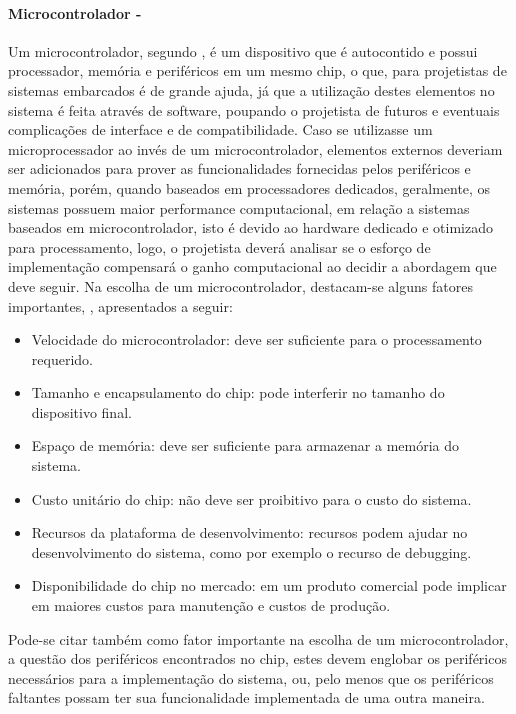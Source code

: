 \paragraph{\textbf{Microcontrolador -}}
Um microcontrolador, segundo , é um dispositivo que é autocontido e possui processador, memória e periféricos em um mesmo chip, o que, para projetistas de sistemas embarcados é de grande ajuda, já que a utilização destes elementos no sistema é feita através de software, poupando o projetista de futuros e eventuais complicações de interface e de compatibilidade. Caso se utilizasse um microprocessador ao invés de um microcontrolador, elementos externos deveriam ser adicionados para prover as funcionalidades fornecidas pelos periféricos e memória, porém, quando baseados em processadores dedicados, geralmente, os sistemas possuem maior performance computacional, em relação a sistemas baseados em microcontrolador, isto é devido ao hardware dedicado e otimizado para processamento, logo, o projetista deverá analisar se o esforço de implementação compensará o ganho computacional ao decidir a abordagem que deve seguir.
Na escolha de um microcontrolador, destacam-se alguns fatores importantes, \cite[p.8]{Chatto2013}, apresentados a seguir: 
\begin{itemize}
    \item Velocidade do microcontrolador:
    deve ser suficiente para o processamento requerido.
    \item Tamanho e encapsulamento do chip:
    pode interferir no tamanho do dispositivo final. 
    \item Espaço de memória:
    deve ser suficiente para armazenar a memória do sistema.
    \item Custo unitário do chip:
    não deve ser proibitivo para o custo do sistema.
    \item Recursos da plataforma de desenvolvimento:
    recursos podem ajudar no desenvolvimento do sistema, como por exemplo o recurso de debugging.
    \item Disponibilidade do chip no mercado:
    em um produto comercial pode implicar em maiores custos para manutenção e custos de produção.
\end{itemize}

Pode-se citar também como fator importante na escolha de um microcontrolador, a questão dos periféricos encontrados no chip, estes devem englobar os periféricos necessários para a implementação do sistema, ou, pelo menos que os periféricos faltantes possam ter sua funcionalidade implementada de uma outra maneira.

